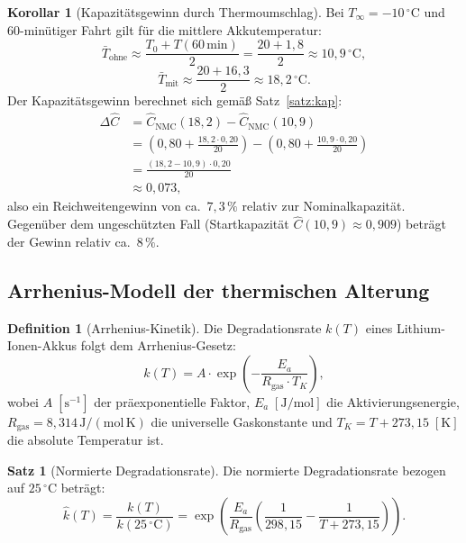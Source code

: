 ﻿\documentclass[a4paper,12pt]{article}
\theoremstyle{definition}
\newtheorem{definition}{Definition}
\newtheorem{satz}{Satz}
\newtheorem{korollar}{Korollar}
\begin{document}
\begin{korollar}[Kapazit\"atsgewinn durch Thermoumschlag]
\label{kor:kapgewinn}
Bei $T_\infty = -10\,{}^\circ\mathrm{C}$ und 60-min\"utiger Fahrt gilt f\"ur die mittlere Akkutemperatur:
\[
  \bar{T}_\mathrm{ohne} \approx \frac{T_0 + T(60\,\mathrm{min})}{2} = \frac{20 + 1{,}8}{2} \approx 10{,}9\,{}^\circ\mathrm{C},
\]
\[
  \bar{T}_\mathrm{mit} \approx \frac{20 + 16{,}3}{2} \approx 18{,}2\,{}^\circ\mathrm{C}.
\]
Der Kapazit\"atsgewinn berechnet sich gem\"a\ss{} Satz~\ref{satz:kap}:
\begin{align*}
  \Delta\hat{C} &= \hat{C}_\mathrm{NMC}(18{,}2) - \hat{C}_\mathrm{NMC}(10{,}9) \\
  &= \left(0{,}80 + \frac{18{,}2 \cdot 0{,}20}{20}\right) - \left(0{,}80 + \frac{10{,}9 \cdot 0{,}20}{20}\right) \\
  &= \frac{(18{,}2 - 10{,}9) \cdot 0{,}20}{20} \\ &\approx 0{,}073,
\end{align*}
also ein Reichweitengewinn von ca.\ $7{,}3\,\%$ relativ zur Nominalkapazit\"at. Gegen\"uber dem ungesch\"utzten Fall (Startkapazit\"at $\hat{C}(10{,}9) \approx 0{,}909$) betr\"agt der Gewinn relativ ca.\ $8\,\%$.
\end{korollar}

\subsection{Arrhenius-Modell der thermischen Alterung}

\begin{definition}[Arrhenius-Kinetik]
Die Degradationsrate $k(T)$ eines Lithium-Ionen-Akkus folgt dem Arrhenius-Gesetz:
\[
  k(T) = A \cdot \exp\!\left(-\frac{E_a}{R_\mathrm{gas} \cdot T_K}\right),
\]
wobei $A\;[\mathrm{s^{-1}}]$ der pr\"aexponentielle Faktor, $E_a\;[\mathrm{J/mol}]$ die Aktivierungsenergie, $R_\mathrm{gas} = 8{,}314\,\mathrm{J/(mol\,K)}$ die universelle Gaskonstante und $T_K = T + 273{,}15\;[\mathrm{K}]$ die absolute Temperatur ist.
\end{definition}

\begin{satz}[Normierte Degradationsrate]
\label{satz:arrhenius}
Die normierte Degradationsrate bezogen auf $25\,{}^\circ\mathrm{C}$ betr\"agt:
\[
  \hat{k}(T) = \frac{k(T)}{k(25\,{}^\circ\mathrm{C})} = \exp\!\left(\frac{E_a}{R_\mathrm{gas}}\left(\frac{1}{298{,}15} - \frac{1}{T + 273{,}15}\right)\right).
\]
\end{satz}
\end{document}
